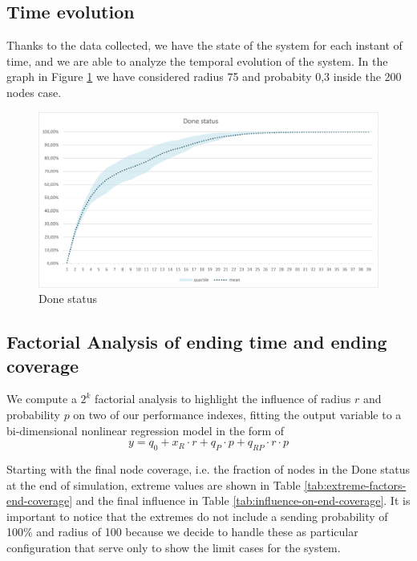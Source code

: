\subsection{Time evolution}
Thanks to the data collected, we have the state of the system for each instant of time, and we are able to analyze the temporal evolution of the system. In the graph in Figure \ref{fig:done-status} we have considered radius 75 and probabity 0,3 inside the 200 nodes case.
\begin{figure}[H]
\centering
    \includegraphics[width= 1\textwidth]{./images/DoneStatus_200N-30p75r.png}
    \caption{Done status}
    \label{fig:done-status}
\end{figure}

\subsection{Factorial Analysis of ending time and ending coverage}

We compute a $2^k$ factorial analysis to highlight the influence of radius $r$ and probability $p$ on two of our performance indexes, fitting the output variable to a bi-dimensional nonlinear regression model in the form of 
$$
y = q_0 + x_R \cdot r + q_P \cdot p + q_{RP} \cdot r \cdot p
$$

Starting with the final node coverage, i.e. the fraction of nodes in the Done status at the end of simulation, extreme values are shown in Table \ref{tab:extreme-factors-end-coverage} and the final influence in Table \ref{tab:influence-on-end-coverage}. It is important to notice that the extremes do not include a sending probability of 100\% and radius of 100 because we decide to handle these as particular configuration that serve only to show the limit cases for the system.

